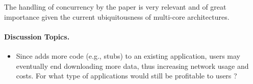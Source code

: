 The handling of concurrency by the paper is very relevant and
of great importance given the current ubiquitousness of
multi-core architectures.

\paragraph{Discussion Topics.}
\begin{itemize}
\item Since \dl{} adds more code (e.g., stubs) to an existing application, users
may eventually end downloading more data, thus increasing network usage and
costs. For what type of applications would \dl{} still be profitable to 
users ?

\end{itemize}
